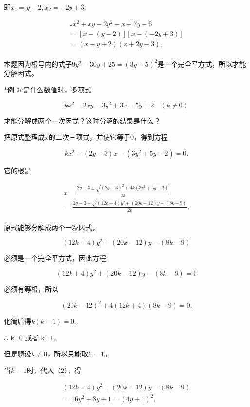 即\(x_{1} = y - 2, x_{2} = -2y + 3.\)

\[
\begin{array}{l} \therefore x ^ {2} + x y - 2 y ^ {2} - x + 7 y - 6 \\ = [ x - (y - 2) ] [ x - (- 2 y + 3) ] \\ = (x - y + 2) (x + 2 y - 3)\text{。} \\ \end{array}
\]

本题因为根号内的式子\(9y^{2} - 30y + 25 = (3y - 5)^{2}\)是一个完全平方式，所以才能分解因式。

*例 3\(k\)是什么数值时，多项式

\[
k x ^ {2} - 2 x y - 3 y ^ {2} + 3 x - 5 y + 2 \quad (k \neq 0)
\]

才能分解成两个一次因式？这时分解的结果是什么？

 把原式整理成\(x\)的二次三项式，并使它等于0，得到方程

\[
k x ^ {2} - (2 y - 3) x - (3 y ^ {2} + 5 y - 2) = 0.
\]

它的根是

\[
\begin{array}{l} x = \frac{2 y - 3 \pm \sqrt {(2 y - 3) ^ {2} + 4 k (3 y ^ {2} + 5 y - 2)}}{2 k} \\ = \frac{2 y - 3 \pm \sqrt {(12 k + 4) y ^ {2} + (20 k - 12) y - (8 k - 9)}}{2 k}. \tag{1} \\ \end{array}
\]

原式能够分解成两个一次因式，

\[
(12 k + 4) y ^ {2} + (20 k - 12) y - (8 k - 9) \tag{2}
\]

必须是一个完全平方式，因此方程

\[
(12 k + 4) y ^ {2} + (20 k - 12) y - (8k - 9) = 0
\]

必须有等根，所以

\[
(20 k - 12) ^ {2} + 4 (12 k + 4) (8 k - 9) = 0.
\]

化简后得\(k(k - 1) = 0.\)

∴ k=0 或者 k=1。

但是题设\(k \neq 0\)，所以只能取\(k = 1\)。

当\(k = 1\)时，代入（2），得

\[
\begin{array}{l} (12 k + 4) y ^ {2} + (20 k - 12) y - (8 k - 9) \\ = 16 y ^ {2} + 8 y + 1 = (4 y + 1) ^ {2}. \\ \end{array}
\]

